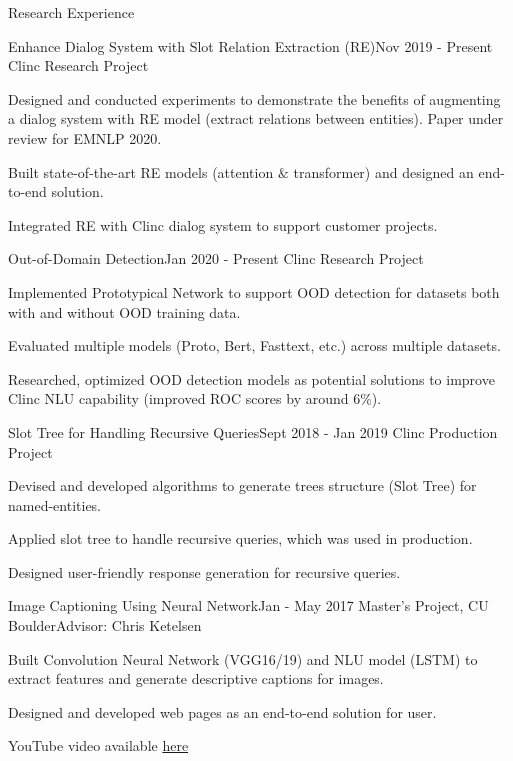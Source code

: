 \documentclass{resume} %
\begin{document}

\begin{rSection}{Research Experience}

\begin{rSubsection}{Enhance Dialog System with Slot Relation Extraction (RE)}{Nov 2019 - Present }{Clinc Research Project}{}
\item Designed and conducted experiments to demonstrate the benefits of augmenting a dialog system with RE model (extract relations between entities). Paper under review for EMNLP 2020.
\item Built state-of-the-art RE models (attention $\&$ transformer) and designed an end-to-end solution.
\item Integrated RE with Clinc dialog system to support customer projects.
\end{rSubsection}

\begin{rSubsection}{Out-of-Domain Detection}{Jan 2020 - Present }{Clinc Research Project}{}
\item Implemented Prototypical Network to support OOD detection for datasets both with and without OOD training data.
\item Evaluated multiple models (Proto, Bert, Fasttext, etc.) across multiple datasets.
\item Researched, optimized OOD detection models as potential solutions to improve Clinc NLU capability (improved ROC scores by around 6\%).
\end{rSubsection}

\begin{rSubsection}{Slot Tree for Handling Recursive Queries}{Sept 2018 - Jan 2019 }{Clinc Production Project}{}
\item Devised and developed algorithms to generate trees structure (Slot Tree) for named-entities.
\item Applied slot tree to handle recursive queries, which was used in production. 
\item Designed user-friendly response generation for recursive queries.
\end{rSubsection}

\begin{rSubsection}{Image Captioning Using Neural Network}{Jan - May 2017 }{Master's Project, CU Boulder}{Advisor: Chris Ketelsen}
\item Built Convolution Neural Network (VGG16/19) and NLU model (LSTM) to extract features and generate descriptive captions for images.
\item Designed and developed web pages as an end-to-end solution for user.
\item YouTube video available \href{https://www.youtube.com/watch?v=f2waevH1b6I}{here}
\end{rSubsection}


\end{rSection}
\end{document}
